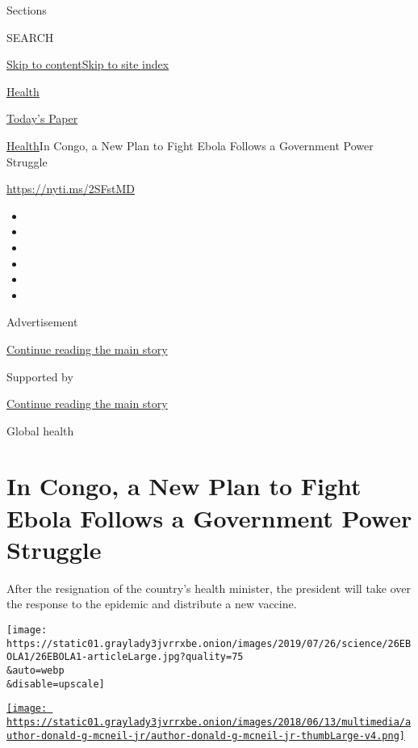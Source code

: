 Sections

SEARCH

\protect\hyperlink{site-content}{Skip to
content}\protect\hyperlink{site-index}{Skip to site index}

\href{https://www.nytimes3xbfgragh.onion/section/health}{Health}

\href{https://myaccount.nytimes3xbfgragh.onion/auth/login?response_type=cookie\&client_id=vi}{}

\href{https://www.nytimes3xbfgragh.onion/section/todayspaper}{Today's
Paper}

\href{/section/health}{Health}\textbar{}In Congo, a New Plan to Fight
Ebola Follows a Government Power Struggle

\url{https://nyti.ms/2SFstMD}

\begin{itemize}
\item
\item
\item
\item
\item
\item
\end{itemize}

Advertisement

\protect\hyperlink{after-top}{Continue reading the main story}

Supported by

\protect\hyperlink{after-sponsor}{Continue reading the main story}

Global health

\hypertarget{in-congo-a-new-plan-to-fight-ebola-follows-a-government-power-struggle}{%
\section{In Congo, a New Plan to Fight Ebola Follows a Government Power
Struggle}\label{in-congo-a-new-plan-to-fight-ebola-follows-a-government-power-struggle}}

After the resignation of the country's health minister, the president
will take over the response to the epidemic and distribute a new
vaccine.

\texttt{[image: https://static01.graylady3jvrrxbe.onion/images/2019/07/26/science/26EBOLA1/26EBOLA1-articleLarge.jpg?quality=75\\\&auto=webp\\\&disable=upscale]}

\href{https://www.nytimes3xbfgragh.onion/by/donald-g-mcneil-jr}{\texttt{[image: https://static01.graylady3jvrrxbe.onion/images/2018/06/13/multimedia/author-donald-g-mcneil-jr/author-donald-g-mcneil-jr-thumbLarge-v4.png]}}

